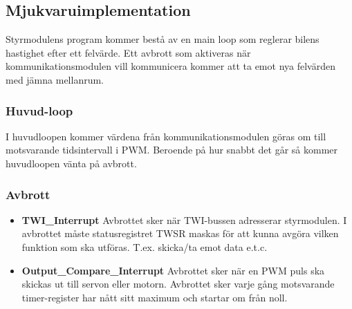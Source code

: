 \documentclass[designspec/spec.tex]{subfiles}
\begin{document}
\subsection{Mjukvaruimplementation}
Styrmodulens program kommer bestå av en main loop som reglerar bilens hastighet
efter ett felvärde. Ett avbrott som aktiveras när kommunikationsmodulen vill
kommunicera kommer att ta emot nya felvärden med jämna mellanrum.

\subsubsection{Huvud-loop}
I huvudloopen kommer värdena från kommunikationsmodulen göras om till
motsvarande tidsintervall i PWM. Beroende på hur snabbt det går så kommer
huvudloopen vänta på avbrott.

\subsubsection{Avbrott}
\begin{itemize}
	\item \textbf{TWI\_Interrupt} Avbrottet sker när TWI-bussen adresserar
	styrmodulen. I avbrottet måste statusregistret TWSR maskas för att kunna
	avgöra vilken funktion som ska utföras. T.ex. skicka/ta emot data e.t.c. 

	\item \textbf{Output\_Compare\_Interrupt} Avbrottet sker när en PWM puls
	ska skickas ut till servon eller motorn. Avbrottet sker varje gång
	motsvarande timer-register har nått sitt maximum och startar om från noll.
\end{itemize}
\end{document}
